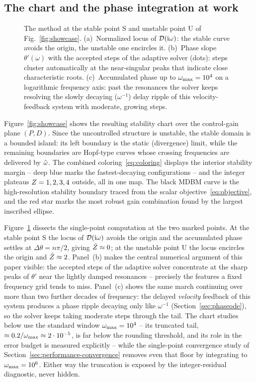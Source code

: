 \subsection{The chart and the phase integration at work}\label{sec:showcase-chart}

\begin{figure}[tb]
  \centering
  \caption{The method at the stable point S and unstable point U of
  Fig.~\ref{fig:showcase}. (a)~Normalized locus of
  $\mathcal{D}(\mathrm{i}\omega)$: the stable curve avoids the origin, the unstable one
  encircles it. (b)~Phase slope $\theta'(\omega)$ with the accepted steps of
  the adaptive solver (dots): steps cluster automatically at the
  near-singular peaks that indicate close characteristic roots.
  (c)~Accumulated phase up to $\omega_{\mathrm{max}}=10^{4}$ on a logarithmic frequency
  axis: past the resonances the solver keeps resolving the slowly decaying
  ($\omega^{-1}$) delay ripple of this velocity-feedback system with
  moderate, growing steps.}\label{fig:walkthrough}
\end{figure}

Figure~\ref{fig:showcase} shows the resulting stability chart over the
control-gain plane $(P,D)$. Since the uncontrolled structure is unstable,
the stable domain is a bounded island: its left boundary is the static
(divergence) limit, while the remaining boundaries are Hopf-type curves whose
crossing frequencies are delivered by $\hat{\omega}$. The combined
coloring~\eqref{eq:coloring} displays the interior stability margin -- deep blue
marks the fastest-decaying configurations -- and the integer plateaus
$Z=1,2,3,4$ outside, all in one map. The black MDBM curve is the
high-resolution stability boundary traced from the scalar
objective~\eqref{eq:objective}, and the red star marks the most robust
gain combination found by the largest inscribed ellipse.

Figure~\ref{fig:walkthrough} dissects the single-point computation at the
two marked points. At the stable point S the locus of $\mathcal{D}(\mathrm{i}\omega)$
avoids the origin and the accumulated phase settles at $\Delta\theta=n\pi/2$,
giving $\tilde{Z}\approx0$; at the unstable point U the locus encircles the
origin and $\tilde{Z}\approx2$. Panel~(b) makes the central numerical argument
of this paper visible: the accepted steps of the adaptive solver concentrate
at the sharp peaks of $\theta'$ near the lightly damped resonances --
precisely the features a fixed frequency grid tends to miss. Panel~(c) shows
the same march continuing over more than two further decades of frequency:
the delayed \emph{velocity} feedback of this system produces a phase ripple
decaying only like $\omega^{-1}$ (Section~\ref{sec:phaseode}), so the solver
keeps taking moderate steps through the tail. The chart studies below use
the standard window $\omega_{\mathrm{max}}=10^{4}$ -- its truncated tail,
$\approx0.2/\omega_{\mathrm{max}}\approx2\cdot10^{-5}$, is far below the rounding threshold,
and its role in the error budget is measured explicitly -- while the
single-point convergence study of Section~\ref{sec:performance-convergence}
removes even that floor by integrating to $\omega_{\mathrm{max}}=10^{6}$. Either way the
truncation is exposed by the integer-residual diagnostic, never hidden.

